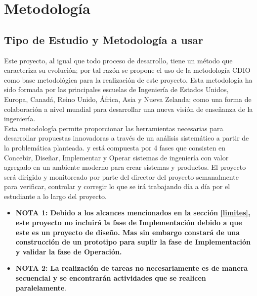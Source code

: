 \section{Metodolog\'ia}

\subsection{Tipo de Estudio y Metodolog\'ia a usar} 
Este proyecto, al igual que todo proceso de desarrollo, tiene un m\'etodo que caracteriza su evoluci\'on; por tal raz\'on se propone el uso de la metodolog\'ia CDIO como base metodol\'ogica para la realizaci\'on de este proyecto. 
Esta metodología  ha sido formada por las principales escuelas de Ingeniería de Estados Unidos, Europa, Canadá, Reino Unido, África, Asia y Nueva Zelanda; como una forma de colaboración a nivel mundial para desarrollar una nueva visión de enseñanza de la ingeniería.\\

Esta metodolog\'ia permite proporcionar las herramientas necesarias para desarrollar propuestas innovadoras a trav\'es de un an\'alisis sistem\'atico a partir de la problem\'atica planteada. y est\'a compuesta por 4 fases que consisten en Concebir, Diseñar, Implementar y Operar sistemas de ingeniería con valor agregado en un ambiente moderno para crear sistemas y productos. El proyecto ser\'a  dirigido y monitoreado por parte del director del proyecto semanalmente para verificar, controlar y corregir lo que se irá trabajando día a día por el estudiante a lo largo del proyecto.

\begin{itemize}
	\item \textbf{NOTA 1: Debido a los alcances mencionados en la secci\'on \ref{limites}, este proyecto no incluir\'a la fase de Implementaci\'on debido a que este es un proyecto de dise\~no. Mas sin embargo constará de una construcción de un prototipo para suplir la fase de Implementación y validar la fase de Operación.}
	\item \textbf{NOTA 2: La realizaci\'on de tareas no necesariamente es de manera secuencial y se encontrar\'an actividades que se realicen paralelamente}.\\\\
\end{itemize}

